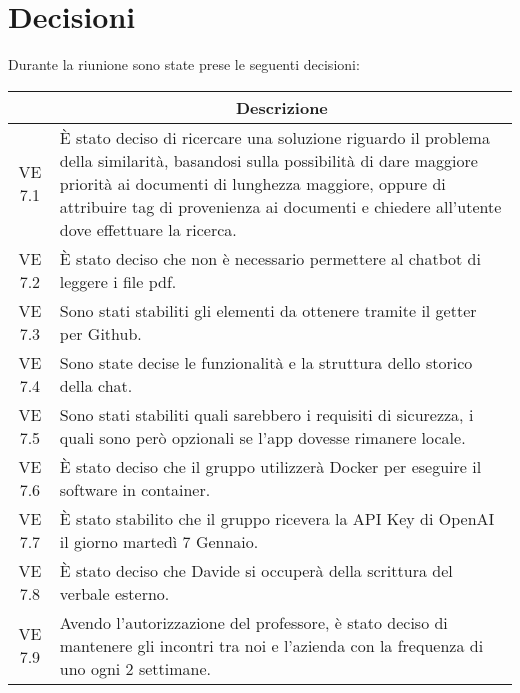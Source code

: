 

\section{Decisioni}

Durante la riunione sono state prese le seguenti decisioni:

\vspace{0.5cm}

\begin{table}[htbp]
    \centering
    \begin{tabular}{|c|p{}|}
        \hline
        \rowcolor[gray]{0.75}
        \multicolumn{1}{|c|}{\textbf{Codice}} & \multicolumn{1}{|c|}{\textbf{Descrizione}}\\
        \hline
        VE 7.1 & È stato deciso di ricercare una soluzione riguardo il problema della similarità, basandosi sulla possibilità di dare maggiore priorità ai documenti di lunghezza maggiore, oppure di attribuire tag di provenienza ai documenti e chiedere all'utente dove effettuare la ricerca. \\
        VE 7.2 & È stato deciso che non è necessario permettere al chatbot di leggere i file pdf. \\
        VE 7.3 & Sono stati stabiliti gli elementi da ottenere tramite il getter per Github. \\
        VE 7.4 & Sono state decise le funzionalità e la struttura dello storico della chat. \\
        VE 7.5 & Sono stati stabiliti quali sarebbero i requisiti di sicurezza, i quali sono però opzionali se l'app dovesse rimanere locale. \\
        VE 7.6 & È stato deciso che il gruppo utilizzerà Docker per eseguire il software in container. \\
        VE 7.7 & È stato stabilito che il gruppo ricevera la API Key di OpenAI il giorno martedì 7 Gennaio. \\
        VE 7.8 & È stato deciso che Davide si occuperà della scrittura del verbale esterno. \\
        VE 7.9 & Avendo l'autorizzazione del professore, è stato deciso di mantenere gli incontri tra noi e l'azienda con la frequenza di uno ogni 2 settimane. \\
        \hline
    \end{tabular}
\end{table}
